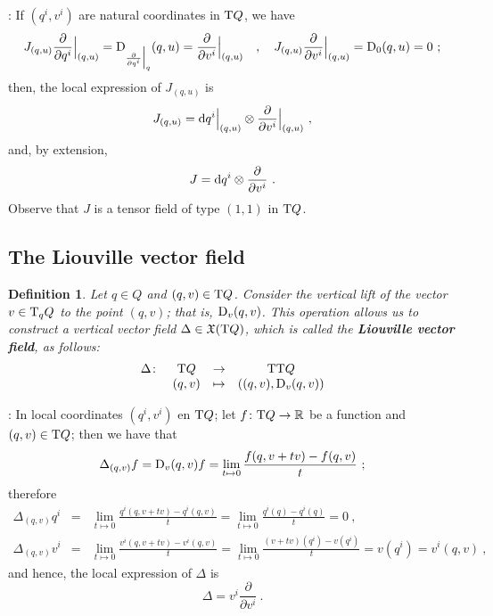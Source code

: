 \documentclass[12pt]{report}
\newtheorem{definition}[teor]{Definition}
\def\derpar#1#2{\frac{\partial{#1}}{\partial{#2}}}
\def\vf{\mathfrak X}
\def\d{{\rm d}}
\def\Real{\mathbb{R}}
\def\Tan{{\rm T}}
\begin{document}
:
If $(q^i,v^i)$ are natural coordinates in $\Tan Q$, we have
$$
J_{(q,u)}\derpar{}{q^i}\Big\vert_{(q,u)}=
{\rm D}_{\derpar{}{q^i}\Big\vert_q}(q,u)=\derpar{}{v^i}\Big\vert_{(q,u)}
\quad , \quad
J_{(q,u)}\derpar{}{v^i}\Big\vert_{(q,u)}={\rm D}_0(q,u)=0 \ ;
$$
then, the local expression of $J_{(q,u)}$ is
$$
J_{(q,u)}=\d q^i\Big\vert_{(q,u)}\otimes\derpar{}{v^i}\Big\vert_{(q,u)} \ ,
$$
and, by extension,
$$
J=\d q^i\otimes\derpar{}{v^i} \ .
$$
Observe that $J$ is a tensor field of type $(1,1)$ in $\Tan Q$.


\subsection{The Liouville vector field}


\begin{definition}
Let $q\in Q$ and $(q,v)\in\Tan Q$.
Consider the vertical lift of  the vector $v\in \Tan_qQ$
to the point $(q,v)$; that is, ${\rm D}_v(q,v)$.
This operation allows us to construct a vertical vector field
$\Delta \in \vf(\Tan Q)$, which is called the \textbf{Liouville vector field},
as follows:
$$
\begin{array}{cccc}
\Delta \colon & \Tan Q & \to & \Tan\Tan Q
\\
& (q,v) & \mapsto & ((q,v),{\rm D}_v(q,v))
\end{array}
$$
\end{definition}

:
In local coordinates $(q^i,v^i)$ en $\Tan Q$;  
let $f\colon\Tan Q \to \Real$ be a function and $(q,v)\in\Tan Q$; 
then we have that
$$
\Delta_{(q,v)}f={\rm D}_v(q,v)f=
\lim_{t \mapsto 0}\frac{f(q,v+tv)-f(q,v)}{t} \ ;
$$
therefore
\begin{eqnarray*}
\Delta_{(q,v)}q^i &=&
\lim_{t \mapsto 0}\frac{q^i(q,v+tv)-q^i(q,v)}{t}
=\lim_{t \mapsto 0}\frac{q^i(q)-q^i(q)}{t}=0 \ ,
\\
\Delta_{(q,v)}v^i&=&
\lim_{t \mapsto 0}\frac{v^i(q,v+tv)-v^i(q,v)}{t}
=\lim_{t \mapsto 0}\frac{(v+tv)(q^i)-v(q^i)}{t}=v(q^i)=v^i(q,v) \ ,
\end{eqnarray*}
and hence, the local expression of $\Delta$ is
$$
\Delta=v^i\derpar{}{v^i} \ .
$$
\end{document}
